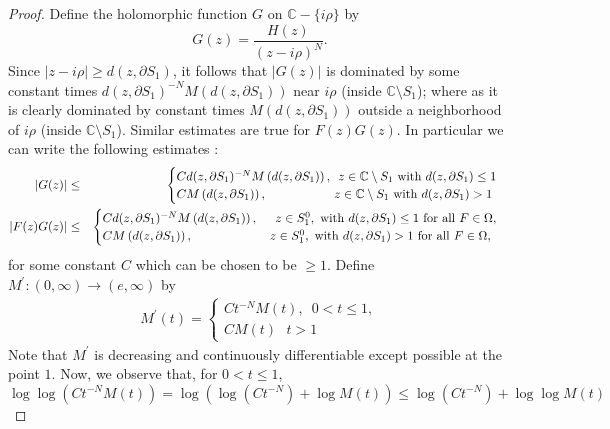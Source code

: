 \documentclass[11pt,reqno]{amsart}
\theoremstyle{definition}
\theoremstyle{definition}
\numberwithin{equation}{section}
\begin{document}
\begin{proof}
Define the holomorphic function $G$ on $\mathbb{C}-\{i\rho\}$ by
$$
G(z)=\frac{H(z)}{(z-i\rho)^N}.
$$
Since $|z-i\rho|\geq d(z,\partial S_1)$, it follows that $|G(z)|$ is dominated by some constant times $d(z,\partial S_1)^{-N}M\left(d(z,\partial S_1)\right)$ near $i\rho$ (inside $\mathbb{C}\setminus S_1$); where as it is clearly dominated by constant times $M(d(z,\partial S_1))$ outside a neighborhood of $i\rho$ (inside $\mathbb{C}\setminus S_1$). Similar estimates are true for $F(z)G(z)$. In particular we can write the following estimates :
\begin{eqnarray*}
|G(z)| &\leq &
\begin{cases}
C d(z,\partial S_1)^{-N}M\left(d(z,\partial S_1)\right),\,\,\, z\in\mathbb{C}\setminus S_1\,\,\textup{with}\,\,d(z,\partial S_1)\leq 1\\
C M\left(d(z,\partial S_1)\right),\,\,\hspace{18mm}z\in\mathbb{C}\setminus S_1\,\,\textup{with}\,\,d(z,\partial S_1)>1
\end{cases}\\
|F(z)G(z)| &\leq &
\begin{cases}
C d(z,\partial S_1)^{-N}M\left(d(z,\partial S_1)\right),\,\,\,\,\,\hspace{2mm}z\in S_1^0,\,\,\textup{with}\,\,d(z,\partial S_1)\leq 1\,\,\textup{for all}\,\,F\in\Omega,\\
CM\left(d(z,\partial S_1)\right),\,\,\,\,\,\hspace{19mm}z\in S_1^0,\,\,\textup{with}\,\,d(z,\partial S_1)> 1\,\,\textup{for all}\,\,F\in\Omega,
\end{cases}
\end{eqnarray*}
for some constant $C$ which can be chosen to be $\geq 1$. Define $M^\prime:(0,\infty)\rightarrow (e,\infty)$ by
\begin{eqnarray*}
M^\prime(t)=
\begin{cases}
Ct^{-N}M(t),\,\,\, 0<t\leq 1,\\
CM(t)\,\,\,\, t>1
\end{cases}
\end{eqnarray*}
Note that $M^\prime$ is decreasing and continuously differentiable except possible at the point $1$. 
Now, we observe that, for $0<t\leq 1$,
$$
\log\log(Ct^{-N}M(t))=\log\left(\log(Ct^{-N})+\log M(t)\right)\leq \log(Ct^{-N})+\log\log M(t)
$$
\end{proof}
\end{document}
